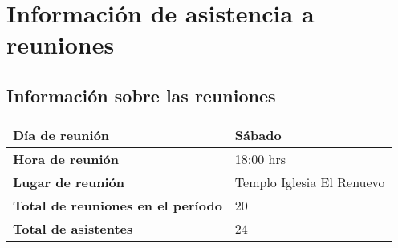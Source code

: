 \documentclass[12pt,letterpaper]{article}
\begin{document}
\section{Información de asistencia a reuniones}
\subsection{Información sobre las reuniones}
\begin{table}[!h]
\centering
\begin{tabular}{|l|l|}
\hline
\textbf{Día de reunión} & Sábado \\ \hline
\textbf{Hora de reunión} & 18:00 hrs \\ \hline
\textbf{Lugar de reunión} & Templo Iglesia El Renuevo \\ \hline
\textbf{Total de reuniones en el período} & 20 \\ \hline
\textbf{Total de asistentes} & 24 \\ \hline
\end{tabular}
\end{table}
\end{document}

